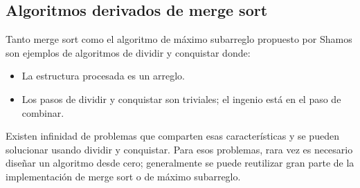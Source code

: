 \subsection{Algoritmos derivados de merge sort}
\label{sec:combinar}

Tanto merge sort como el algoritmo de máximo subarreglo propuesto por Shamos son ejemplos de algoritmos de dividir y conquistar donde:
\begin{itemize}
  \item La estructura procesada es un arreglo.
  \item Los pasos de dividir y conquistar son triviales; el ingenio está en el paso de combinar.
\end{itemize}

Existen infinidad de problemas que comparten esas características y se pueden solucionar usando dividir y conquistar. Para esos problemas, rara vez es necesario diseñar un algoritmo desde cero; generalmente se puede reutilizar gran parte de la implementación de merge sort o de máximo subarreglo.

